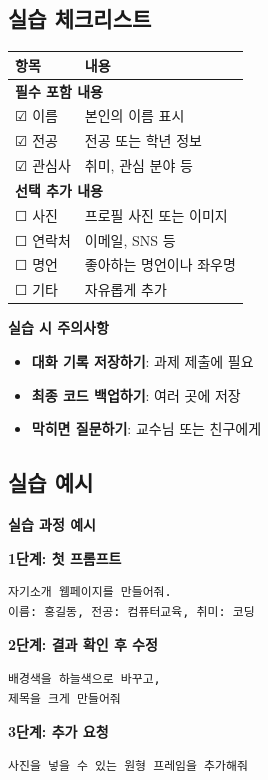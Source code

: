 \documentclass[11pt, a4paper]{article}
\begin{document}
\subsection{실습 체크리스트}

\begin{table}[H]
\centering
\begin{tabularx}{\textwidth}{|l|X|}
\hline
\rowcolor{lightgray}
\textbf{항목} & \textbf{내용} \\
\hline
\multicolumn{2}{|l|}{\textbf{필수 포함 내용}} \\
\hline
☑ 이름 & 본인의 이름 표시 \\
\hline
☑ 전공 & 전공 또는 학년 정보 \\
\hline
☑ 관심사 & 취미, 관심 분야 등 \\
\hline
\multicolumn{2}{|l|}{\textbf{선택 추가 내용}} \\
\hline
☐ 사진 & 프로필 사진 또는 이미지 \\
\hline
☐ 연락처 & 이메일, SNS 등 \\
\hline
☐ 명언 & 좋아하는 명언이나 좌우명 \\
\hline
☐ 기타 & 자유롭게 추가 \\
\hline
\end{tabularx}
\end{table}

\begin{warning}
\textbf{실습 시 주의사항}
\begin{itemize}
  \item \textbf{대화 기록 저장하기}: 과제 제출에 필요
  \item \textbf{최종 코드 백업하기}: 여러 곳에 저장
  \item \textbf{막히면 질문하기}: 교수님 또는 친구에게
\end{itemize}
\end{warning}

\subsection{실습 예시}

\begin{example}
\textbf{실습 과정 예시}

\textbf{1단계: 첫 프롬프트}
\begin{verbatim}
자기소개 웹페이지를 만들어줘.
이름: 홍길동, 전공: 컴퓨터교육, 취미: 코딩
\end{verbatim}

\textbf{2단계: 결과 확인 후 수정}
\begin{verbatim}
배경색을 하늘색으로 바꾸고,
제목을 크게 만들어줘
\end{verbatim}

\textbf{3단계: 추가 요청}
\begin{verbatim}
사진을 넣을 수 있는 원형 프레임을 추가해줘
\end{verbatim}
\end{example}
\end{document}
